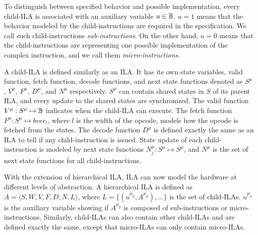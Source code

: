 \documentclass[letterpaper, 11 pt]{article}  %
\begin{document}
To distinguish between specified behavior and possible implementation, every 
child-ILA is associated with an auxiliary variable $u \in \mathbb{B}$. 
$u = 1$ means that the behavior modeled by the child-instructions are required
in the specification.
We call such child-instructions \textit{sub-instructions}.
On the other hand, $u = 0$ means that the child-instructions are representing 
one possible implementation of the complex instruction, and we call them
\textit{micro-instructions}.

A child-ILA is defined similarly as an ILA.
It has its own state variables, valid function, fetch function, decode functions, 
and next state functions denoted as $S^\mu$, $V^\mu$, $F^\mu$, $D^\mu$, and 
$N^\mu$ respectively.
$S^\mu$ can contain shared states in $S$ of its parent ILA, and every update to
the shared states are synchronized.
The valid function $V^\mu : S^\mu \mapsto \mathbb{B}$ indicates when the child-ILA
can execute.
The fetch function $F^\mu : S^\mu \mapsto bvec_l$, where $l$ is the width of the
opcode, models how the opcode is fetched from the states.
The decode function $D^\mu$ is defined exactly the same as an ILA to tell if 
any child-instruction is issued.
State update of each child-instruction is modeled by next state functions
$N^\mu_j : S^\mu \mapsto S^\mu$, and $N^\mu$ is the set of next state functions 
for all child-instructions.

\iffalse
Summarizing the above definition, a child-ILA is defined as follow:
\begin{eqnarray}
  A^\mu &=& \langle S^\mu, V^\mu, F^\mu, D^\mu, N^\mu \rangle 
        \text{, where} \nonumber \\
    &S^\mu& \text{ is the vector of state variables, } \nonumber \\
    &V^\mu& : S^\mu \mapsto \bd \text{ is the valid function, } \nonumber \\
    &F^\mu& : S^\mu \mapsto bvec_l \text{ is the fetch function, } \nonumber \\
    &D^\mu& = \{ \delta_j^\mu : bvec_l \mapsto \bd \}
            \text{ is the decode function, and} \nonumber \\
    &N^\mu& = \{ N_j^\mu : S^\mu \mapsto S^\mu \}
            \text{ is the next state function.} \nonumber
\end{eqnarray}
\fi

With the extension of hierarchical ILA, ILA can now model the hardware at 
different levels of abstraction.
%
A hierarchical ILA is defined as
$A = \langle S, W, V, F, D, N, L \rangle$, where 
$L = \{ (u^{\mu_p}, A^{\mu_p}), \dots \}$ is the set of child-ILAs.
$u^{\mu_p}$ is the auxiliary variable showing if $A^{\mu_p}$ is composed of 
sub-instructions or micro-instructions.
%
Similarly, child-ILAs can also contain other child-ILAs and are defined exactly 
the same, except that micro-ILAs can only contain micro-ILAs.
\end{document}
